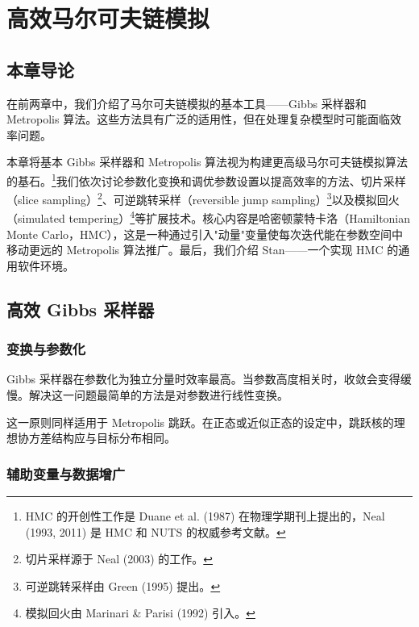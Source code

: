 
\chapter{高效马尔可夫链模拟}

\section{本章导论}

在前两章中，我们介绍了马尔可夫链模拟的基本工具——Gibbs 采样器和 Metropolis 算法。这些方法具有广泛的适用性，但在处理复杂模型时可能面临效率问题。

本章将基本 Gibbs 采样器和 Metropolis 算法视为构建更高级马尔可夫链模拟算法的基石。\footnote{HMC 的开创性工作是 Duane et al. (1987) 在物理学期刊上提出的，Neal (1993, 2011) 是 HMC 和 NUTS 的权威参考文献。}我们依次讨论参数化变换和调优参数设置以提高效率的方法、切片采样（slice sampling）\footnote{切片采样源于 Neal (2003) 的工作。}、可逆跳转采样（reversible jump sampling）\footnote{可逆跳转采样由 Green (1995) 提出。}以及模拟回火（simulated tempering）\footnote{模拟回火由 Marinari \& Parisi (1992) 引入。}等扩展技术。核心内容是哈密顿蒙特卡洛（Hamiltonian Monte Carlo，HMC），这是一种通过引入"动量"变量使每次迭代能在参数空间中移动更远的 Metropolis 算法推广。最后，我们介绍 Stan——一个实现 HMC 的通用软件环境。

\section{高效 Gibbs 采样器}

\subsection{变换与参数化}

Gibbs 采样器在参数化为独立分量时效率最高。当参数高度相关时，收敛会变得缓慢。解决这一问题最简单的方法是对参数进行线性变换。

\begin{Remark}
  这一原则同样适用于 Metropolis 跳跃。在正态或近似正态的设定中，跳跃核的理想协方差结构应与目标分布相同。
\end{Remark}

\subsection{辅助变量与数据增广}

